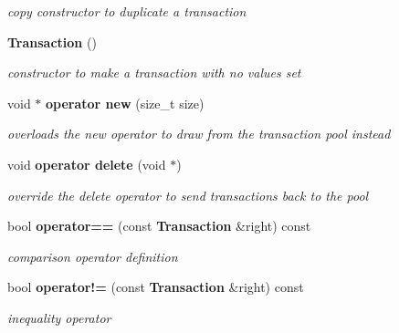 \begin{CompactItemize}
\begin{CompactList}\small\item\em copy constructor to duplicate a transaction \item\end{CompactList}\item 
{\bf Transaction} ()\label{class_d_r_a_msim_i_i_1_1_transaction_b47005b855d38bc324bb79fd023baa13}

\begin{CompactList}\small\item\em constructor to make a transaction with no values set \item\end{CompactList}\item 
void $\ast$ {\bf operator new} (size\_\-t size)
\begin{CompactList}\small\item\em overloads the new operator to draw from the transaction pool instead \item\end{CompactList}\item 
void {\bf operator delete} (void $\ast$)
\begin{CompactList}\small\item\em override the delete operator to send transactions back to the pool \item\end{CompactList}\item 
bool {\bf operator==} (const {\bf Transaction} \&right) const \label{class_d_r_a_msim_i_i_1_1_transaction_b4f7300d5c8d4ef667d7f060c1e148a2}

\begin{CompactList}\small\item\em comparison operator definition \item\end{CompactList}\item 
bool {\bf operator!=} (const {\bf Transaction} \&right) const \label{class_d_r_a_msim_i_i_1_1_transaction_08a3515c210fcd34a4131a2f9c0263c0}

\begin{CompactList}\small\item\em inequality operator \item\end{CompactList}\end{CompactItemize}
